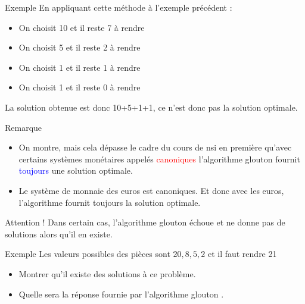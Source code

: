 \documentclass[10pt]{beamer}
\begin{document}
\begin{frame}
    \mframe{\AG}
    \begin{exampleblock}{Exemple}
        En appliquant cette méthode à l'exemple précédent :
        \begin{itemize}
            \item<2-> On choisit 10 et il reste 7 à rendre
            \item<3-> On choisit 5 et il reste 2 à rendre
            \item<4-> On choisit 1 et il reste 1 à rendre
            \item<5-> On choisit 1 et il reste 0 à rendre
        \end{itemize}
         La solution obtenue est donc 10+5+1+1, ce n'est donc pas la solution optimale.
    \end{exampleblock}
\end{frame}

\begin{frame}
    \mframe{\AG}
    \begin{block}{Remarque}
        \begin{itemize}
            \item<1-> On montre, mais cela dépasse le cadre du cours de {\sc nsi} en première qu'avec certains systèmes monétaires appelés \textcolor{red}{canoniques} l'algorithme glouton fournit \textcolor{blue}{toujours} une solution optimale.
            \item<2-> Le système de monnaie des euros est canoniques. Et donc avec les euros, l'algorithme fournit toujours la solution optimale.
        \end{itemize}
    \end{block}
\end{frame}

\begin{frame}
    \mframe{\AG}
    \begin{block}{Attention !}
        Dans certain cas, l'algorithme glouton échoue et ne donne pas de solutions alors qu'il en existe.
    \end{block}
    \begin{exampleblock}{Exemple}
        Les valeurs possibles des pièces sont $20,8,5,2$ et il faut rendre 21
        \begin{itemize}
            \item<3-> Montrer qu'il existe des solutions à ce problème.
            \item<4-> Quelle sera la réponse fournie par l'algorithme glouton .
        \end{itemize}
    \end{exampleblock}
\end{frame}
\end{document}
